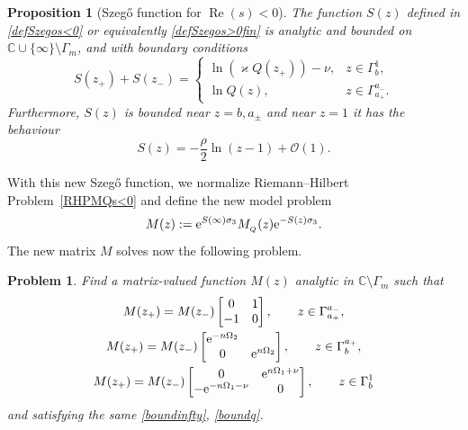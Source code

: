 \documentclass[10pt,a4paper]{amsart}
\numberwithin{equation}{section}
\newtheorem{Proposition}[Theorem]{Proposition}
\newtheorem{problem}[Theorem]{Problem}
\theoremstyle{definition}
\def\le{\left}
\def\ri{\right}
\def\nn{\nonumber}
\def\C{{\mathbb C}}
\def\s{\sigma}
\def \Re{\operatorname{Re} }
\begin{document}
\begin{Proposition}[Szeg\H{o} function for $\Re(s)<0$]\label{propSzegos<0}
The function $S(z)$ defined in \eqref{defSzegos<0} or equivalently \eqref{defSzegos>0fin} is analytic and bounded on $\C\cup \{\infty\}\setminus \Gamma_m$, and with boundary conditions
\[
S(z_+)+ S(z_-) =
\begin{cases}
\ln \le(\varkappa Q(z_+)\ri) - \nu,& z\in \Gamma_b^1,\\
\ln Q(z), & z\in \Gamma_{a_+}^{a_-}.
\end{cases}
\]
Furthermore, $S(z)$ is bounded near $z=b,a_\pm$ and near $z=1$ it has the behaviour
\[
S(z) = -\frac { {\rho}} 2\ln(z-1) + \mathcal O(1).
\]
\end{Proposition}
With this new Szeg\H{o} function, we normalize Riemann--Hilbert Problem~\ref{RHPMQs<0} and define the new model problem
\[
M(z):= {\rm e}^{S(\infty) \s_3} M_{_{Q}}(z) {\rm e}^{-S(z) \s_3}.
\]
The new matrix $M$ solves now the following problem.
\begin{problem}
\label{RHPMs<0}
Find a matrix-valued function $M(z)$ analytic in $\C \setminus \Gamma_m$ such that
\begin{gather}
M(z_+)= M(z_-) \begin{bmatrix}
0 & 1 \\
-1 & 0
\end{bmatrix}, \qquad z\in \Gamma_{a_+}^{a_-},
\nn
\\
M(z_+)= M(z_-) \begin{bmatrix}
{\rm e}^{-n\Omega_2}\\
0 & {\rm e}^{n\Omega_2}
\end{bmatrix},\qquad z\in \Gamma_b^{a_+},
\nn
\\
M(z_+)= M(z_-) \begin{bmatrix}
0 & {\rm e}^{n\Omega_1+\nu}\\
-{\rm e}^{-n\Omega_1-\nu}& 0
\end{bmatrix}, \qquad z\in \Gamma_b^{1}
\label{jumpMs<0}
\end{gather}
and satisfying the same \eqref{boundinfty}, \eqref{boundq}.
\end{problem}
\end{document}
